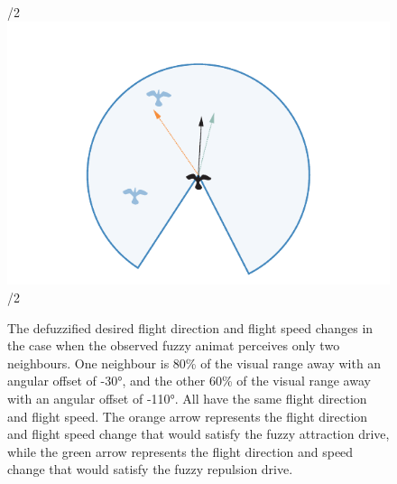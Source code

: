 \begin{figure}%
\vspace\gridH/2
\includegraphics{fig[attractionFLSout]}
\vspace\gridH/2
\caption{The defuzzified desired flight direction and flight speed changes in the case when the observed fuzzy animat perceives only two neighbours. One neighbour is 80\% of the visual range away with an angular offset of \ang{-30}, and the other 60\% of the visual range away with an angular offset of \ang{-110}. All have the same flight direction and flight speed. The orange arrow represents the flight direction and flight speed change that would satisfy the fuzzy attraction drive, while the green arrow represents the flight direction and speed change that would satisfy the fuzzy repulsion drive.}
\label{fig:attraction:FLS:output}
\end{figure}
